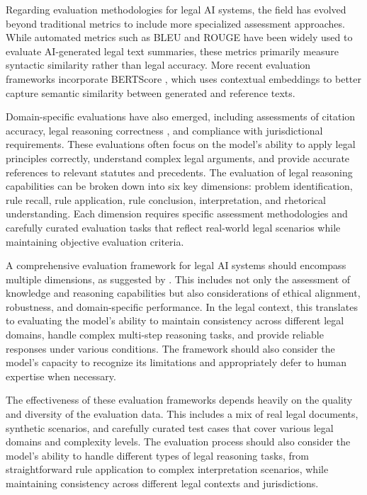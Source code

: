 Regarding evaluation methodologies for legal AI systems, the field has evolved beyond traditional metrics
to include more specialized assessment approaches. While automated metrics such as BLEU \cite{Papineni_bleu} 
and ROUGE \cite{lin-2004-rouge} have been widely used to evaluate AI-generated legal text summaries, 
these metrics primarily measure syntactic similarity rather than legal accuracy. More recent evaluation 
frameworks incorporate BERTScore \cite{zhang2020bertscoreevaluatingtextgeneration}, which uses contextual 
embeddings to better capture semantic similarity between generated and reference texts. 

Domain-specific evaluations have also emerged, including assessments of citation accuracy, 
legal reasoning correctness \cite{guha2023legalbench}, and compliance with jurisdictional requirements.
These evaluations often focus on the model's ability to apply legal principles correctly, 
understand complex legal arguments, and provide accurate references to relevant statutes and precedents.
The evaluation of legal reasoning capabilities can be broken down into six key dimensions: problem identification, 
rule recall, rule application, rule conclusion, interpretation, and rhetorical understanding. Each dimension 
requires specific assessment methodologies and carefully curated evaluation tasks that reflect real-world legal 
scenarios while maintaining objective evaluation criteria.

A comprehensive evaluation framework for legal AI systems should encompass multiple dimensions, as suggested by \cite{guo2023evaluating}. 
This includes not only the assessment of knowledge and reasoning capabilities but also considerations of ethical alignment, 
robustness, and domain-specific performance. In the legal context, this translates to evaluating the model's ability to 
maintain consistency across different legal domains, handle complex multi-step reasoning tasks, and provide reliable 
responses under various conditions. The framework should also consider the model's capacity to recognize its limitations 
and appropriately defer to human expertise when necessary.

The effectiveness of these evaluation frameworks depends heavily on the quality and diversity of the evaluation 
data. This includes a mix of real legal documents, synthetic scenarios, and carefully curated test cases that 
cover various legal domains and complexity levels. The evaluation process should also consider the model's 
ability to handle different types of legal reasoning tasks, from straightforward rule application to complex 
interpretation scenarios, while maintaining consistency across different legal contexts and jurisdictions.

